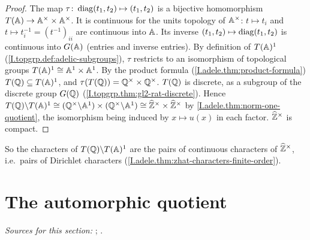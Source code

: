 \begin{theorem}
\end{theorem}
\begin{proof}
The map $\tau\colon\operatorname{diag}(t_1,t_2)\mapsto(t_1,t_2)$ is a bijective homomorphism $T(\mathbb{A})\to\mathbb{A}^\times\times\mathbb{A}^\times$. It is
continuous for the units topology of $\mathbb{A}^\times$: $t\mapsto t_i$ and $t\mapsto t_i^{-1}=(t^{-1})_{ii}$ are continuous into
$\mathbb{A}$. Its inverse $(t_1,t_2)\mapsto\operatorname{diag}(t_1,t_2)$ is continuous into $G(\mathbb{A})$ (entries and inverse entries). By definition
of $T(\mathbb{A})^1$ (\cref{I.topgrp.def:adelic-subgroups}), $\tau$ restricts to an isomorphism of topological groups
$T(\mathbb{A})^1\cong\mathbb{A}^1\times\mathbb{A}^1$. By the product formula (\cref{I.adele.thm:product-formula}) $T(\mathbb{Q})\subseteq T(\mathbb{A})^1$, and
$\tau(T(\mathbb{Q}))=\mathbb{Q}^\times\times\mathbb{Q}^\times$. $T(\mathbb{Q})$ is discrete, as a subgroup of the discrete group $G(\mathbb{Q})$
(\cref{I.topgrp.thm:gl2-rat-discrete}). Hence
$T(\mathbb{Q})\backslash T(\mathbb{A})^1\cong(\mathbb{Q}^\times\backslash\mathbb{A}^1)\times(\mathbb{Q}^\times\backslash\mathbb{A}^1)\cong\widehat{\mathbb{Z}}^\times\times\widehat{\mathbb{Z}}^\times$
by \cref{I.adele.thm:norm-one-quotient}, the isomorphism being induced by $x\mapsto u(x)$ in each factor. $\widehat{\mathbb{Z}}^\times$ is
compact.
\end{proof}
\noindent So the characters of $T(\mathbb{Q})\backslash T(\mathbb{A})^1$ are the pairs of continuous characters of $\widehat{\mathbb{Z}}^\times$, i.e.\ pairs of
Dirichlet characters (\cref{I.adele.thm:zhat-characters-finite-order}).

\section{The automorphic quotient}\label{sec:quot-automorphic}

\noindent\emph{Sources for this section:} \cite[§1]{AIntro}; \cite[§1]{A-R1}.

